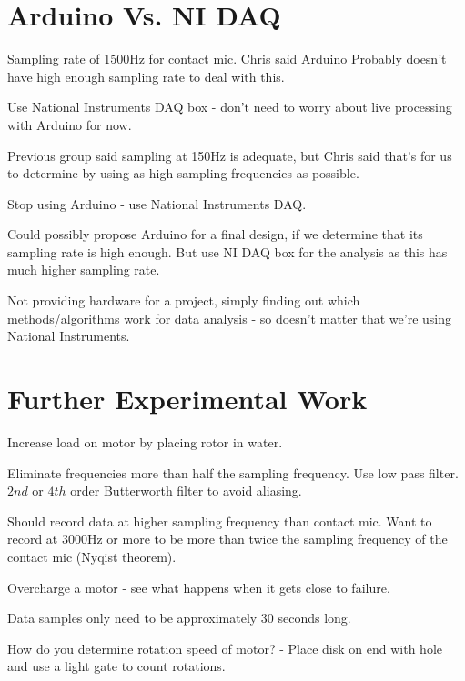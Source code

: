 \documentclass[11pt]{meetingmins}
\begin{document}
\maketitle


\section{Arduino Vs. NI DAQ}
\begin{items}
\item
Sampling rate of 1500Hz for contact mic. Chris said Arduino Probably doesn't have high enough sampling rate to deal with this.

\item
Use National Instruments DAQ box - don't need to worry about live processing with Arduino for now.

\item
Previous group said sampling at 150Hz is adequate, but Chris said that's for us to determine by using as high sampling frequencies as possible.

\item
Stop using Arduino - use National Instruments DAQ.

\item
Could possibly propose Arduino for a final design, if we determine that its sampling rate is high enough. But use NI DAQ box for the analysis as this has much higher sampling rate.

\item
Not providing hardware for a project, simply finding out which methods/algorithms work for data analysis - so doesn't matter that we're using National Instruments.
\end{items}

\section{Further Experimental Work}
\begin{items}
\item
Increase load on motor by placing rotor in water.

\item
Eliminate frequencies more than half the sampling frequency. Use low pass filter. $2nd$ or $4th$ order Butterworth filter to avoid aliasing.

\item
Should record data at higher sampling frequency than contact mic. Want to record at 3000Hz or more to be more than twice the sampling frequency of the contact mic (Nyqist theorem).

\item
Overcharge a motor - see what happens when it gets close to failure.

\item
Data samples only need to be approximately 30 seconds long.

\item
How do you determine rotation speed of motor? - Place disk on end with hole and use a light gate to count rotations.

\end{items}
\end{document}

